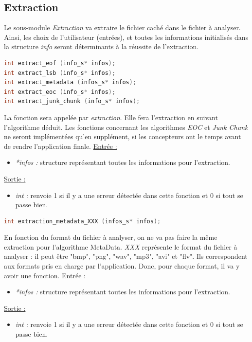 \documentclass[11pt]{article}
\begin{document}
\subsection{Extraction}

Le sous-module \textit{Extraction} va extraire le fichier caché dans le 
fichier à analyser. Ainsi, les choix de l'utilisateur (entrées), et toutes les
informations initialisés dans la structure \textit{info} seront déterminants 
à la réussite de l'extraction. 

\begin{lstlisting}[language=c]
int extract_eof (info_s* infos); 
int extract_lsb (info_s* infos);
int extract_metadata (infos_s* infos);
int extract_eoc (info_s* infos);
int extract_junk_chunk (info_s* infos);
\end{lstlisting}

La fonction sera appelée par \textit{extraction}.
Elle fera l'extraction en suivant l'algorithme déduit. 
Les fonctions concernant les algorithmes \textit{EOC} et \textit{Junk Chunk} 
ne seront implémentées qu'en supplément, si les concepteurs ont le temps 
avant de rendre l'application finale. 
\newline
\underline{Entrée :} 
\begin{itemize}
\item \textit{*infos :} structure représentant toutes les informations pour 
l'extraction.  
\end{itemize}
\underline{Sortie :} 
\begin{itemize}
\item \textit{int :} renvoie 1 si il y a une erreur détectée dans cette 
fonction et 0 si tout se passe bien.  
\newline 
\end{itemize}

\begin{lstlisting}[language=c]
int extraction_metadata_XXX (infos_s* infos);
\end{lstlisting}

En fonction du format du fichier à analyser, on ne va pas faire la même 
extraction pour l'algorithme MetaData. 
\textit{XXX} représente le format du fichier à analyser : il peut être 
"bmp", "png", "wav", "mp3", "avi" et "flv". Ils correspondent aux formats 
pris en charge par l'application. Donc, pour chaque format, il va y avoir 
une fonction.  
\newline
\underline{Entrée :} 
\begin{itemize}
\item \textit{*infos :} structure représentant toutes les informations pour 
l'extraction. 
\end{itemize}
\underline{Sortie :} 
\begin{itemize}
\item \textit{int :} renvoie 1 si il y a une erreur détectée dans cette 
fonction et 0 si tout se passe bien.  
\newline 
\end{itemize}
\end{document}
